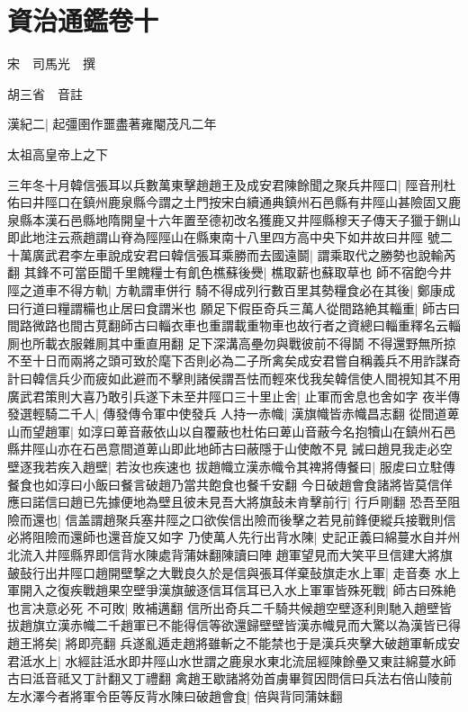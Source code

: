 \chapter{資治通鑑卷十}
宋　司馬光　撰

胡三省　音註

漢紀二|{
	起彊圉作噩盡著雍閹茂凡二年}


太祖高皇帝上之下

三年冬十月韓信張耳以兵數萬東擊趙趙王及成安君陳餘聞之聚兵井陘口|{
	陘音刑杜佑曰井陘口在鎮州鹿泉縣今謂之土門按宋白續通典鎮州石邑縣有井陘山甚險固又鹿泉縣本漢石邑縣地隋開皇十六年置至德初改名獲鹿又井陘縣穆天子傳天子獵于鉶山即此地注云燕趙謂山脊為陘陘山在縣東南十八里四方高中央下如井故曰井陘}
號二十萬廣武君李左車說成安君曰韓信張耳乘勝而去國遠鬬|{
	謂乘取代之勝勢也說輸芮翻}
其鋒不可當臣聞千里餽糧士有飢色樵蘇後㸑|{
	樵取薪也蘇取草也}
師不宿飽今井陘之道車不得方軌|{
	方軌謂車併行}
騎不得成列行數百里其勢糧食必在其後|{
	鄭康成曰行道曰糧謂糒也止居曰食謂米也}
願足下假臣奇兵三萬人從間路絶其輜重|{
	師古曰間路微路也間古莧翻師古曰輜衣車也重謂載重物車也故行者之資總曰輜重釋名云輜厠也所載衣服雜厠其中重直用翻}
足下深溝高壘勿與戰彼前不得鬬不得還野無所掠不至十日而兩將之頭可致於麾下否則必為二子所禽矣成安君嘗自稱義兵不用詐謀奇計曰韓信兵少而疲如此避而不擊則諸侯謂吾怯而輕來伐我矣韓信使人間視知其不用廣武君策則大喜乃敢引兵遂下未至井陘口三十里止舍|{
	止軍而舍息也舍如字}
夜半傳發選輕騎二千人|{
	傳發傳令軍中使發兵}
人持一赤幟|{
	漢旗幟皆赤幟昌志翻}
從間道萆山而望趙軍|{
	如淳曰萆音蔽依山以自覆蔽也杜佑曰萆山音蔽今名抱犢山在鎮州石邑縣井陘山亦在石邑意間道萆山即此地師古曰蔽隱于山使敵不見}
誡曰趙見我走必空壁逐我若疾入趙壁|{
	若汝也疾速也}
拔趙幟立漢赤幟令其禆將傳餐曰|{
	服䖍曰立駐傳餐食也如淳曰小飯曰餐言破趙乃當共飽食也餐千安翻}
今日破趙會食諸將皆莫信佯應曰諾信曰趙已先據便地為壁且彼未見吾大將旗鼔未肯擊前行|{
	行戶剛翻}
恐吾至阻險而還也|{
	信盖謂趙聚兵塞井陘之口欲俟信出險而後擊之若見前鋒便縱兵接戰則信必將阻險而還師也還音旋又如字}
乃使萬人先行出背水陳|{
	史記正義曰綿蔓水自并州北流入井陘縣界即信背水陳處背蒲妹翻陳讀曰陣}
趙軍望見而大笑平旦信建大將旗皷鼔行出井陘口趙開壁撃之大戰良久於是信與張耳佯棄鼔旗走水上軍|{
	走音奏}
水上軍開入之復疾戰趙果空壁爭漢旗皷逐信耳信耳已入水上軍軍皆殊死戰|{
	師古曰殊絶也言决意必死}
不可敗|{
	敗補邁翻}
信所出奇兵二千騎共候趙空壁逐利則馳入趙壁皆拔趙旗立漢赤幟二千趙軍已不能得信等欲還歸壁壁皆漢赤幟見而大驚以為漢皆已得趙王將矣|{
	將即亮翻}
兵遂亂遁走趙將雖斬之不能禁也于是漢兵夾擊大破趙軍斬成安君泜水上|{
	水經註泜水即井陘山水世謂之鹿泉水東北流屈經陳餘壘又東註綿蔓水師古曰泜音祗又丁計翻又丁禮翻}
禽趙王歇諸將効首虜畢賀因問信曰兵法右倍山陵前左水澤今者將軍令臣等反背水陳曰破趙會食|{
	倍與背同蒲妹翻}
